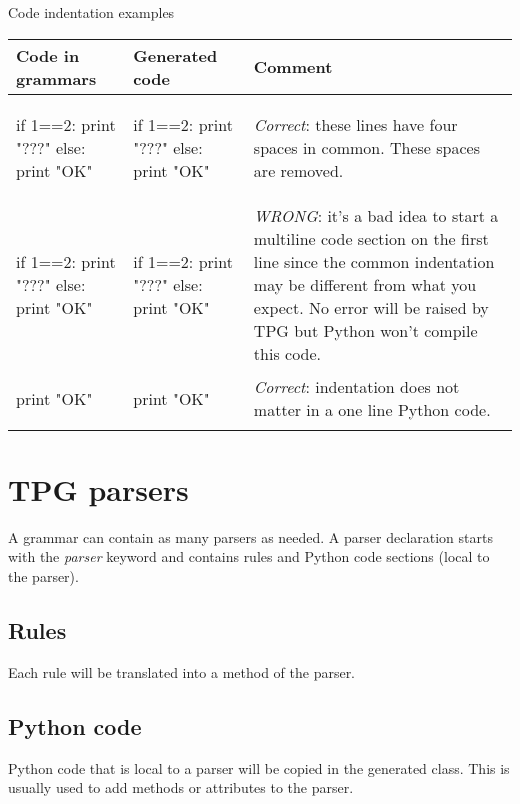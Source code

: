 \begin{tableau}
\caption{Code indentation examples} \label{grammar:indent}
\begin{tabular}{| p{5cm} | p{4cm} | p{4cm} |}
\hline
	Code in grammars & Generated code & Comment \\
\hline
\hline

	\begin{verbatim*}
{{
    if 1==2:
        print "???"
    else:
        print "OK"
}}
	\end{verbatim*}
	&
	\begin{verbatim*}

if 1==2:
    print "???"
else:
    print "OK"
	\end{verbatim*}
	&
	\emph{Correct}: these lines have four spaces in common. These spaces are removed.
	\\

\hline

	\begin{verbatim*}
{{  if 1==2:
        print "???"
    else:
        print "OK"
}}
	\end{verbatim*}
	&
	\begin{verbatim*}
if 1==2:
      print "???"
  else:
      print "OK"
	\end{verbatim*}
	&
	\emph{WRONG}: it's a bad idea to start a multiline code section on the first line since the common indentation may be different from what you expect. No error will be raised by TPG but Python won't compile this code.
	\\

\hline

	\begin{verbatim*}
{{       print "OK" }}
	\end{verbatim*}
	&
	\begin{verbatim*}
print "OK"
	\end{verbatim*}
	&
	\emph{Correct}: indentation does not matter in a one line Python code.
	\\

\hline

\end{tabular}
\end{tableau}

\section{TPG parsers}
\label{grammar:parser}

A grammar can contain as many parsers as needed.
A parser declaration starts with the \emph{parser} keyword and contains rules and Python code sections (local to the parser).

\subsection{Rules}

Each rule will be translated into a method of the parser.

\subsection{Python code}

Python code that is local to a parser will be copied in the generated class.
This is usually used to add methods or attributes to the parser.

